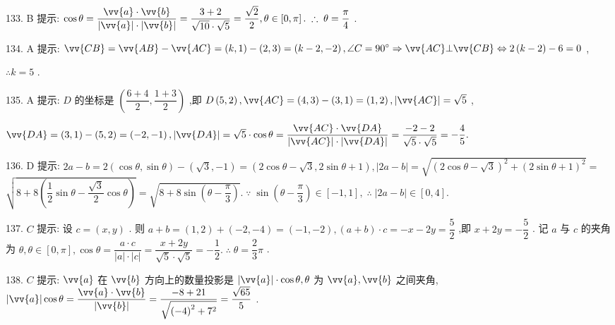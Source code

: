 133. B 提示: $\cos \theta  = \dfrac{\vv{a} \cdot  \vv{b}}{\left| \vv{a}\right|  \cdot  \left| \vv{b}\right| } = \dfrac{3 + 2}{\sqrt{10} \cdot  \sqrt{5}} = \dfrac{\sqrt{2}}{2},\theta  \in  \left\lbrack  {0,\pi }\right\rbrack  .\;\therefore \;\theta  = \dfrac{\pi }{4}$ .

134. A 提示: $\vv{CB} = \vv{AB} - \vv{AC} = \left( {k,1}\right)  - \left( {2,3}\right)  = \left( {k - 2, - 2}\right) ,\angle C = {90}^{ \circ  } \Rightarrow  \vv{AC}\bot \vv{CB} \Leftrightarrow  2\left( {k - 2}\right)  - 6 = 0$ ,

$\therefore k = 5$ .

135. A 提示: $D$ 的坐标是 $\left( {\dfrac{6 + 4}{2},\dfrac{1 + 3}{2}}\right)$ ,即 $D\left( {5,2}\right) ,\vv{AC} = \left( {4,3}\right)  - \left( {3,1}\right)  = \left( {1,2}\right) ,\left| \vv{AC}\right|  = \sqrt{5}$ ,

$\vv{DA} = \left( {3,1}\right)  - \left( {5,2}\right)  = \left( {-2, - 1}\right) ,\left| \vv{DA}\right|  = \sqrt{5} \cdot  \cos \theta  = \dfrac{\vv{AC} \cdot  \vv{DA}}{\left| \vv{AC}\right|  \cdot  \left| \vv{DA}\right| } = \dfrac{-2 - 2}{\sqrt{5} \cdot  \sqrt{5}} =  - \dfrac{4}{5}.$

136. D 提示: ${2a} - b = 2\left( {\cos \theta ,\sin \theta }\right)  - \left( {\sqrt{3}, - 1}\right)  = \left( {2\cos \theta  - \sqrt{3},2\sin \theta  + 1}\right) ,\left| {{2a} - b}\right|  = \sqrt{{\left( 2\cos \theta  - \sqrt{3}\right) }^{2} + {\left( 2\sin \theta  + 1\right) }^{2}} =$  $\sqrt{8 + 8\left( {\dfrac{1}{2}\sin \theta  - \dfrac{\sqrt{3}}{2}\cos \theta }\right) } = \sqrt{8 + 8\sin \left( {\theta  - \dfrac{\pi }{3}}\right) }.\;\because \;\sin \left( {\theta  - \dfrac{\pi }{3}}\right)  \in  \left\lbrack  {-1,1}\right\rbrack  ,\;\therefore \;\left| {{2a} - b}\right|  \in  \left\lbrack  {0,4}\right\rbrack  .$

137. $C$ 提示: 设 $c = \left( {x,y}\right)$ . 则 $a + b = \left( {1,2}\right)  + \left( {-2, - 4}\right)  = \left( {-1, - 2}\right) ,\left( {a + b}\right)  \cdot  c =  - x - {2y} = \dfrac{5}{2}$ ,即 $x + {2y} =  - \dfrac{5}{2}$ . 记 $a$ 与 $c$ 的夹角为 $\theta ,\theta  \in  \left\lbrack  {0,\pi }\right\rbrack  ,\cos \theta  = \dfrac{a \cdot  c}{\left| a\right|  \cdot  \left| c\right| } = \dfrac{x + {2y}}{\sqrt{5} \cdot  \sqrt{5}} =  - \dfrac{1}{2}.\;\therefore \;\theta  = \dfrac{2}{3}\pi$ .

138. $C$ 提示: $\vv{a}$ 在 $\vv{b}$ 方向上的数量投影是 $\left| \vv{a}\right|  \cdot  \cos \theta ,\theta$ 为 $\vv{a},\vv{b}$ 之间夹角, $\left| \vv{a}\right| \cos \theta  = \dfrac{\vv{a} \cdot  \vv{b}}{\left| \vv{b}\right| } = \dfrac{-8 + {21}}{\sqrt{{\left( -4\right) }^{2} + {7}^{2}}} = \dfrac{\sqrt{65}}{5}$ .

